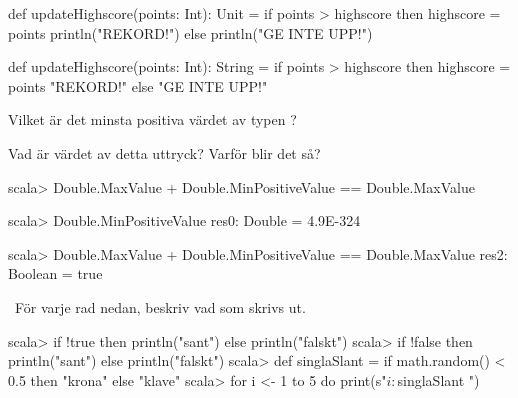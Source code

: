 \SubtaskSolved
\begin{Code}
def updateHighscore(points: Int): Unit =
  if points > highscore then
    highscore = points
    println("REKORD!")
  else println("GE INTE UPP!")
\end{Code}

\SubtaskSolved
\begin{Code}
def updateHighscore(points: Int): String =
  if points > highscore then
    highscore = points
    "REKORD!"
  else "GE INTE UPP!"
\end{Code}



\QUESTEND



\QUESTBEGIN

\Task \what

\Subtask Vilket är det minsta positiva värdet av typen ?

\Subtask Vad är värdet av detta uttryck? Varför blir det så?
\begin{REPL}
scala> Double.MaxValue + Double.MinPositiveValue == Double.MaxValue
\end{REPL}

\SOLUTION

\TaskSolved \what

\SubtaskSolved

\begin{REPL}
scala> Double.MinPositiveValue
res0: Double = 4.9E-324
\end{REPL}

\SubtaskSolved

\begin{REPL}
scala> Double.MaxValue + Double.MinPositiveValue == Double.MaxValue
res2: Boolean = true
\end{REPL}

\QUESTEND




\QUESTBEGIN

\Task \what~För varje rad nedan, beskriv vad som skrivs ut.  %
\begin{REPL}
scala> if !true then println("sant") else println("falskt")
scala> if !false then println("sant") else println("falskt")
scala> def singlaSlant = if math.random() < 0.5 then "krona" else "klave"
scala> for i <- 1 to 5 do print(s"$i:$singlaSlant ")
\end{REPL}

\SOLUTION

